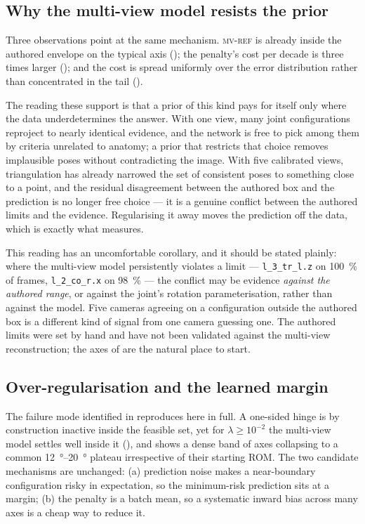 \documentclass[11pt,a4paper]{article}
\newcommand{\lam}{\lambda}
\newcommand{\armref}{\textsc{mv-ref}}
\begin{document}
\subsection{Why the multi-view model resists the prior}
\label{sec:disc-mechanism}

Three observations point at the same mechanism. \armref{} is already
inside the authored envelope on the typical axis
(); the penalty's cost per decade is three times larger
(); and the cost is spread uniformly over the error
distribution rather than concentrated in the tail ().

The reading these support is that a prior of this kind pays for itself only
where the data underdetermines the answer. With one view, many joint
configurations reproject to nearly identical evidence, and the network is free
to pick among them by criteria unrelated to anatomy; a prior that restricts
that choice removes implausible poses without contradicting the image. With
five calibrated views, triangulation has already narrowed the set of consistent
poses to something close to a point, and the residual disagreement between the
authored box and the prediction is no longer free choice --- it is a genuine
conflict between the authored limits and the evidence. Regularising it away
moves the prediction off the data, which is exactly what 
measures.

This reading has an uncomfortable corollary, and it should be stated plainly:
where the multi-view model persistently violates a limit --- \texttt{l\_3\_tr\_l.z}
on \SI{100}{\percent} of frames, \texttt{l\_2\_co\_r.x} on \SI{98}{\percent}
--- the conflict may be evidence \emph{against the authored range}, or against
the joint's rotation parameterisation, rather than against the model. Five
cameras agreeing on a configuration outside the authored box is a different
kind of signal from one camera guessing one. The authored limits were set by
hand and have not been validated against the multi-view reconstruction; the
axes of  are the natural place to start.

\subsection{Over-regularisation and the learned margin}

The failure mode identified in \cite{sv} reproduces here in full. A one-sided
hinge is by construction inactive inside the feasible set, yet for
$\lam \ge 10^{-2}$ the multi-view model settles well inside it
(), and  shows a dense band of axes
collapsing to a common \SIrange{12}{20}{\degree} plateau irrespective of their
starting ROM. The two candidate mechanisms are unchanged: (a) prediction noise
makes a near-boundary configuration risky in expectation, so the minimum-risk
prediction sits at a margin; (b) the penalty is a batch mean, so a systematic
inward bias across many axes is a cheap way to reduce it.
\end{document}
